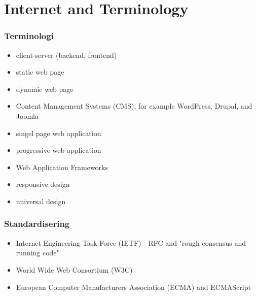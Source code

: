 \section{Internet and Terminology}

\begin{frame}[fragile]
\frametitle{Terminologi}
\color{structure}
\begin{itemize}\color{structure}
  \item client-server (backend, frontend)
  \item static web page
  \item dynamic web page
  \item Content Management Systems (CMS), for example WordPress, Drupal, and Joomla
  \item singel page web application
  \item progressive web application
  \item Web Application Frameworks
  \item responsive design
  \item universal design
\end{itemize}
\end{frame}

\begin{frame}[fragile]
\frametitle{Standardisering}
\color{structure}
\begin{itemize}\color{structure}
  \item Internet Engineering Task Force (IETF) - RFC and "rough consensus and running code"
  \item World Wide Web Consortium (W3C)
  \item European Computer Manufacturers Association (ECMA) and ECMAScript
\end{itemize}
\end{frame}
